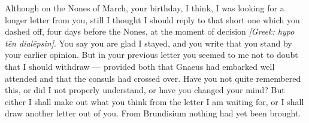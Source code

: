 

 Although on the Nones of March, your birthday, I think, I was looking for a longer letter from you, still I thought I should reply to that short one which you dashed off, four days before the Nones, at the moment of decision \textit{[Greek: hypo tēn dialēpsin]}. You say you are glad I stayed, and you write that you stand by your earlier opinion. But in your previous letter you seemed to me not to doubt that I should withdraw --- provided both that Gnaeus had embarked well attended and that the consuls had crossed over. Have you not quite remembered this, or did I not properly understand, or have you changed your mind? But either I shall make out what you think from the letter I am waiting for, or I shall draw another letter out of you. From Brundisium nothing had yet been brought.
